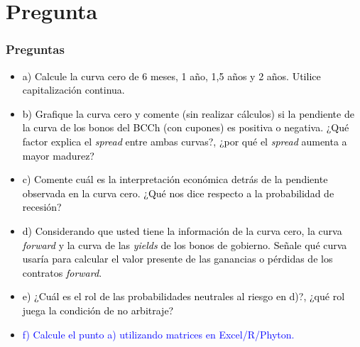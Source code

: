 \documentclass{beamer}
\begin{document}
\section{Pregunta }
\begin{frame}
  \frametitle{Preguntas}
  \begin{itemize}
    \scriptsize
    \item {\textcolor{black}{a) Calcule la curva cero de 6 meses, 1 año, 1,5 años y 2 años. Utilice capitalización continua.}}
    \vspace{3pt}
    \item {\textcolor{black}{b) Grafique la curva cero y comente (sin realizar cálculos) si la pendiente de la curva de los bonos del BCCh (con cupones) es positiva o negativa. ¿Qué factor explica el \textit{spread} entre ambas curvas?, ¿por qué el \textit{spread} aumenta a mayor madurez?}}
    \vspace{3pt}
    \item {\textcolor{black}{c) Comente cuál es la interpretación económica detrás de la pendiente observada en la curva cero. ¿Qué nos dice respecto a la probabilidad de recesión?}}
    \vspace{3pt}
    \item {\textcolor{black}{d) Considerando que usted tiene la información de la curva cero, la curva \textit{forward} y la curva de las \textit{yields} de los bonos de gobierno. Señale qué curva usaría para calcular el valor presente de las ganancias o pérdidas de los contratos \textit{forward}.}}
    \vspace{3pt}
    \item {\textcolor{black}{e) ¿Cuál es el rol de las probabilidades neutrales al riesgo en d)?, ¿qué rol juega la condición de no arbitraje?}}
    \vspace{3pt}
    \item {\Large\textcolor{blue}{f) Calcule el punto a) utilizando matrices en Excel/R/Phyton.}}
    \vspace{3pt}
  \end{itemize}
\end{frame}
\end{document}
